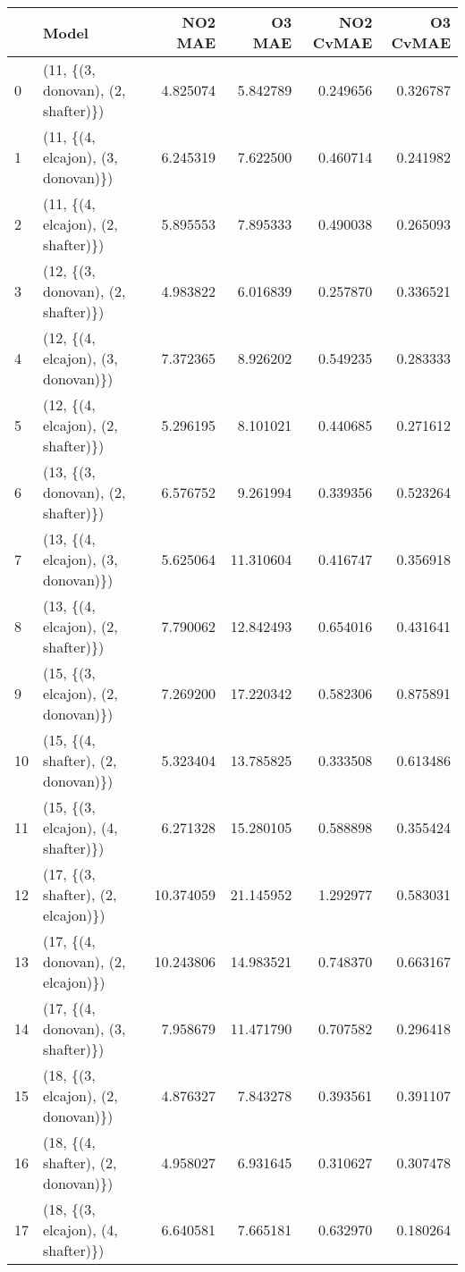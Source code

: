 \begin{tabular}{llrrrr}
\toprule
{} &                               Model &    NO2 MAE &     O3 MAE &  NO2 CvMAE &  O3 CvMAE \\
\midrule
0  &  (11, \{(3, donovan), (2, shafter)\}) &   4.825074 &   5.842789 &   0.249656 &  0.326787 \\
1  &  (11, \{(4, elcajon), (3, donovan)\}) &   6.245319 &   7.622500 &   0.460714 &  0.241982 \\
2  &  (11, \{(4, elcajon), (2, shafter)\}) &   5.895553 &   7.895333 &   0.490038 &  0.265093 \\
3  &  (12, \{(3, donovan), (2, shafter)\}) &   4.983822 &   6.016839 &   0.257870 &  0.336521 \\
4  &  (12, \{(4, elcajon), (3, donovan)\}) &   7.372365 &   8.926202 &   0.549235 &  0.283333 \\
5  &  (12, \{(4, elcajon), (2, shafter)\}) &   5.296195 &   8.101021 &   0.440685 &  0.271612 \\
6  &  (13, \{(3, donovan), (2, shafter)\}) &   6.576752 &   9.261994 &   0.339356 &  0.523264 \\
7  &  (13, \{(4, elcajon), (3, donovan)\}) &   5.625064 &  11.310604 &   0.416747 &  0.356918 \\
8  &  (13, \{(4, elcajon), (2, shafter)\}) &   7.790062 &  12.842493 &   0.654016 &  0.431641 \\
9  &  (15, \{(3, elcajon), (2, donovan)\}) &   7.269200 &  17.220342 &   0.582306 &  0.875891 \\
10 &  (15, \{(4, shafter), (2, donovan)\}) &   5.323404 &  13.785825 &   0.333508 &  0.613486 \\
11 &  (15, \{(3, elcajon), (4, shafter)\}) &   6.271328 &  15.280105 &   0.588898 &  0.355424 \\
12 &  (17, \{(3, shafter), (2, elcajon)\}) &  10.374059 &  21.145952 &   1.292977 &  0.583031 \\
13 &  (17, \{(4, donovan), (2, elcajon)\}) &  10.243806 &  14.983521 &   0.748370 &  0.663167 \\
14 &  (17, \{(4, donovan), (3, shafter)\}) &   7.958679 &  11.471790 &   0.707582 &  0.296418 \\
15 &  (18, \{(3, elcajon), (2, donovan)\}) &   4.876327 &   7.843278 &   0.393561 &  0.391107 \\
16 &  (18, \{(4, shafter), (2, donovan)\}) &   4.958027 &   6.931645 &   0.310627 &  0.307478 \\
17 &  (18, \{(3, elcajon), (4, shafter)\}) &   6.640581 &   7.665181 &   0.632970 &  0.180264 \\

\end{tabular}
